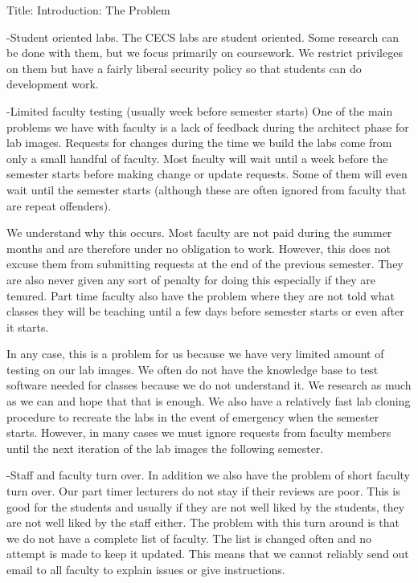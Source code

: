 
Title: Introduction: The Problem

-Student oriented labs.
The CECS labs are student oriented.  Some research can be done with them, but we focus primarily on coursework.  We restrict privileges on them but have a fairly liberal security policy so that students can do development work. 

-Limited faculty testing (usually week before semester starts)
One of the main problems we have with faculty is a lack of feedback during the architect phase for lab images.  Requests for changes during the time we build the labs come from only a small handful of faculty.  Most faculty will wait until a week before the semester starts before making change or update requests.  Some of them will even wait until the semester starts (although these are often ignored from faculty that are repeat offenders).  

We understand why this occurs.  Most faculty are not paid during the summer months and are therefore under no obligation to work.  However, this does not excuse them from submitting requests at the end of the previous semester.  They are also never given any sort of penalty for doing this especially if they are tenured.  Part time faculty also have the problem where they are not told what classes they will be teaching until a few days before semester starts or even after it starts.  

In any case, this is a problem for us because we have very limited amount of testing on our lab images.  We often do not have the knowledge base to test software needed for classes because we do not understand it.  We research as much as we can and hope that that is enough.  We also have a relatively fast lab cloning procedure to recreate the labs in the event of emergency when the semester starts.  However, in many cases we must ignore requests from faculty members until the next iteration of the lab images the following semester.

-Staff and faculty turn over.
In addition we also have the problem of short faculty turn over.  Our part timer lecturers do not stay if their reviews are poor.  This is good for the students and usually if they are not well liked by the students, they are not well liked by the staff either.  The problem with this turn around is that we do not have a complete list of faculty.  The list is changed often and no attempt is made to keep it updated.  This means that we cannot reliably send out email to all faculty to explain issues or give instructions.  

